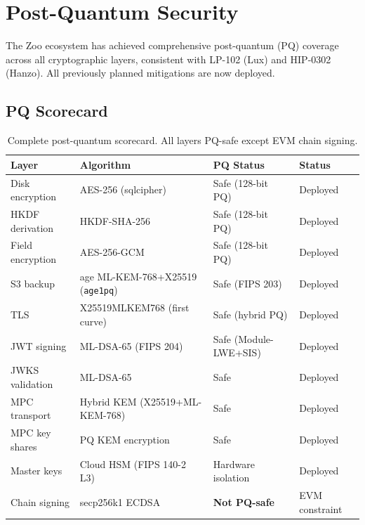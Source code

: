 \section{Post-Quantum Security}


The Zoo ecosystem has achieved comprehensive post-quantum (PQ) coverage
across all cryptographic layers, consistent with LP-102 (Lux) and
HIP-0302 (Hanzo).  All previously planned mitigations are now deployed.

\subsection{PQ Scorecard}

\begin{table}[h]
\centering
\caption{Complete post-quantum scorecard.  All layers PQ-safe except EVM chain signing.}
\begin{tabular}{@{}llll@{}}
\toprule
\textbf{Layer} & \textbf{Algorithm} & \textbf{PQ Status} & \textbf{Status} \\
\midrule
Disk encryption     & AES-256 (sqlcipher)          & Safe (128-bit PQ)    & Deployed \\
HKDF derivation     & HKDF-SHA-256                 & Safe (128-bit PQ)    & Deployed \\
Field encryption    & AES-256-GCM                  & Safe (128-bit PQ)    & Deployed \\
S3 backup           & age ML-KEM-768+X25519 (\texttt{age1pq}) & Safe (FIPS 203) & Deployed \\
TLS                 & X25519MLKEM768 (first curve) & Safe (hybrid PQ)     & Deployed \\
JWT signing         & ML-DSA-65 (FIPS 204)         & Safe (Module-LWE+SIS)& Deployed \\
JWKS validation     & ML-DSA-65                    & Safe                 & Deployed \\
MPC transport       & Hybrid KEM (X25519+ML-KEM-768) & Safe              & Deployed \\
MPC key shares      & PQ KEM encryption            & Safe                 & Deployed \\
Master keys         & Cloud HSM (FIPS 140-2 L3)    & Hardware isolation   & Deployed \\
Chain signing       & secp256k1 ECDSA              & \textbf{Not PQ-safe} & EVM constraint \\
\bottomrule
\end{tabular}
\end{table}


